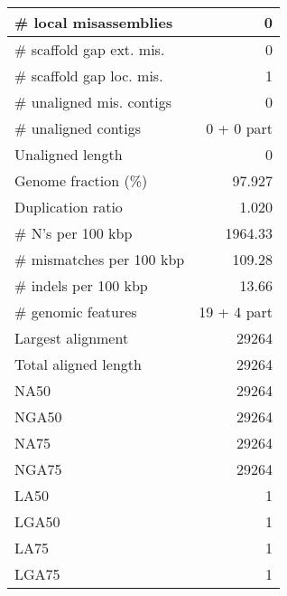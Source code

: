 \documentclass[12pt,a4paper]{article}
\begin{document}
\begin{table}[ht]
\begin{center}
\begin{tabular}{|l*{1}{|r}|}
\# local misassemblies & 0 \\ \hline
\# scaffold gap ext. mis. & 0 \\ \hline
\# scaffold gap loc. mis. & 1 \\ \hline
\# unaligned mis. contigs & 0 \\ \hline
\# unaligned contigs & 0 + 0 part \\ \hline
Unaligned length & 0 \\ \hline
Genome fraction (\%) & 97.927 \\ \hline
Duplication ratio & 1.020 \\ \hline
\# N's per 100 kbp & 1964.33 \\ \hline
\# mismatches per 100 kbp & 109.28 \\ \hline
\# indels per 100 kbp & 13.66 \\ \hline
\# genomic features & 19 + 4 part \\ \hline
Largest alignment & 29264 \\ \hline
Total aligned length & 29264 \\ \hline
NA50 & 29264 \\ \hline
NGA50 & 29264 \\ \hline
NA75 & 29264 \\ \hline
NGA75 & 29264 \\ \hline
LA50 & 1 \\ \hline
LGA50 & 1 \\ \hline
LA75 & 1 \\ \hline
LGA75 & 1 \\ \hline
\end{tabular}
\end{center}
\end{table}
\end{document}

